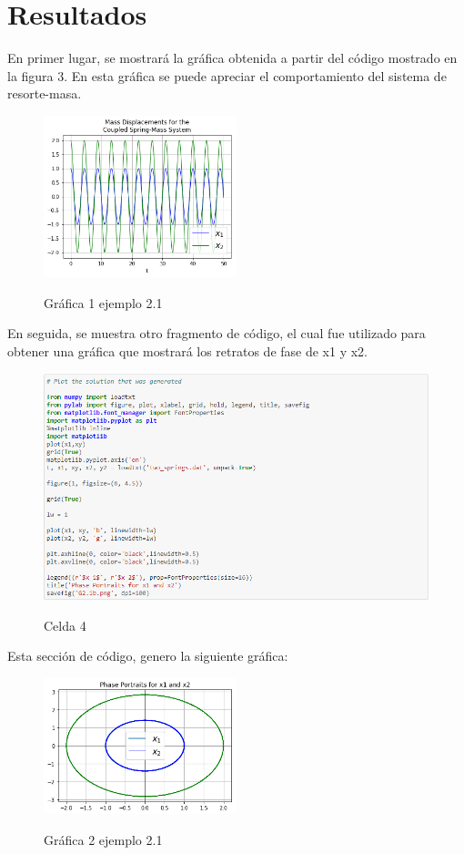 \documentclass{article}
\begin{document}
\section{Resultados}
En primer lugar, se mostrará la gráfica obtenida a partir del código mostrado en la figura 3. En esta gráfica se puede apreciar el comportamiento del sistema de resorte-masa.
\begin{figure}[H]
    \caption{Gráfica 1 ejemplo 2.1}
    \includegraphics[width=0.5\textwidth]{Grafica1.png}
    \centering
    \label{Cod}
\end{figure}
En seguida, se muestra otro fragmento de código, el cual fue utilizado para obtener una gráfica que mostrará los retratos de fase de x1 y x2.
\begin{figure}[H]
    \caption{Celda 4}
    \includegraphics[width=1\textwidth]{Celda4.PNG}
    \centering
    \label{Cod}
\end{figure}
Esta sección de código, genero la siguiente gráfica:
\begin{figure}[H]
    \caption{Gráfica 2 ejemplo 2.1}
    \includegraphics[width=0.5\textwidth]{Grafica2.png}
    \centering
    \label{Cod}
\end{figure}
\end{document}
